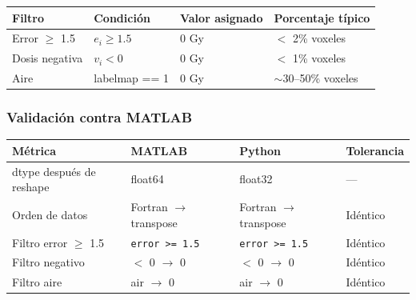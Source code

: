 \documentclass[12pt,a4paper]{article}
\begin{document}
\begin{tabular}{p{3.5cm} p{4cm} p{3cm} p{4cm}}
\toprule
\textbf{Filtro} & \textbf{Condición} & \textbf{Valor asignado} & \textbf{Porcentaje típico} \\
\midrule
Error $\geq$ 1.5 & $e_i \geq 1.5$ & 0 Gy & $<$ 2\% voxeles \\
Dosis negativa & $v_i < 0$ & 0 Gy & $<$ 1\% voxeles \\
Aire & labelmap == 1 & 0 Gy & $\sim$30--50\% voxeles \\
\bottomrule
\end{tabular}

\subsubsection{Validación contra MATLAB}

\begin{tabular}{p{5cm} p{2.5cm} p{2.5cm} p{2.5cm}}
\toprule
\textbf{Métrica} & \textbf{MATLAB} & \textbf{Python} & \textbf{Tolerancia} \\
\midrule
dtype después de reshape & float64 & float32 & --- \\
Orden de datos & Fortran $\to$ transpose & Fortran $\to$ transpose & Idéntico \\
Filtro error $\geq$ 1.5 & \texttt{error >= 1.5} & \texttt{error >= 1.5} & Idéntico \\
Filtro negativo & $<$ 0 $\to$ 0 & $<$ 0 $\to$ 0 & Idéntico \\
Filtro aire & air $\to$ 0 & air $\to$ 0 & Idéntico \\
\bottomrule
\end{tabular}
\end{document}
